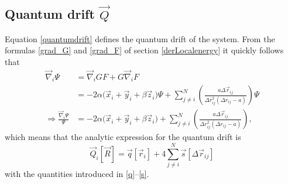 \documentclass[a4paper,8pt]{article}
\begin{document}
\subsection{Quantum drift $\vec{Q}$}\label{derQuantumdrift}
Equation \eqref{quantumdrift} defines the quantum drift of the system. From the formulas \eqref{grad_G} and \eqref{grad_F} of section \ref{derLocalenergy} it quickly follows that
\begin{align}
\vec{\nabla}_i\Psi &= \vec{\nabla}_i G F + G \vec{\nabla}_i F \nonumber\\
&= -2\alpha\Big(\vec{x}_i+\vec{y}_i+\beta\vec{z}_i\Big)\Psi + \sum\limits_{j \neq i}^N \left(\frac{a\Delta\vec{r}_{ij}}{\Delta{r}_{ij}^2(\Delta{r}_{ij}-a)}\right) \Psi \nonumber\\
\Longrightarrow \frac{\vec{\nabla}_i\Psi}{\Psi} &= -2\alpha\Big(\vec{x}_i+\vec{y}_i+\beta\vec{z}_i\Big) + \sum\limits_{j \neq i}^N \left(\frac{a\Delta\vec{r}_{ij}}{\Delta{r}_{ij}^2(\Delta{r}_{ij}-a)}\right),
\end{align}
which means that the analytic expression for the quantum drift is
\begin{equation}
\vec{Q}_i[\vec{R}] = \vec{q}[\vec{r}_i] + 4\sum\limits_{j \neq i}^N \vec{s}[\Delta\vec{r}_{ij}] \label{compQD}
\end{equation}
with the quantities introduced in \eqref{q}–\eqref{s}.
\end{document}
